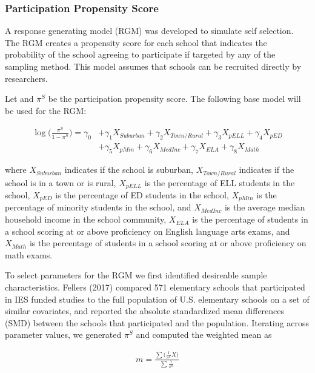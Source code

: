 \documentclass[man,floatsintext]{apa6}
\theoremstyle{definition}
\theoremstyle{definition}
\theoremstyle{definition}
\theoremstyle{remark}
\begin{document}
\hypertarget{participation-propensity-score}{%
\subsubsection{Participation Propensity
Score}\label{participation-propensity-score}}

A response generating model (RGM) was developed to simulate self
selection. The RGM creates a propensity score for each school that
indicates the probability of the school agreeing to participate if
targeted by any of the sampling method. This model assumes that schools
can be recruited directly by researchers.

Let and \(\pi^S\) be the participation propensity score. The following
base model will be used for the RGM:

\begin{align} \label{eq:sRGM}
  \log\bigg(\frac{\pi^S}{1-\pi^S}\bigg) = \gamma_{0} &+ \gamma_{1}X_{Suburban} + \gamma_{2}X_{Town/Rural} + \gamma_{3}X_{pELL} + \gamma_{4}X_{pED} 
  \\
  &+ \gamma_{5}X_{pMin} + \gamma_{6}X_{MedInc} + \gamma_{7}X_{ELA} + \gamma_{8}X_{Math} \nonumber
\end{align}

where \(X_{Suburban}\) indicates if the school is suburban,
\(X_{Town/Rural}\) indicates if the school is in a town or is rural,
\(X_{pELL}\) is the percentage of ELL students in the school,
\(X_{pED}\) is the percentage of ED students in the school, \(X_{pMin}\)
is the percentage of minority students in the school, and \(X_{MedInc}\)
is the average median household income in the school community,
\(X_{ELA}\) is the percentage of students in a school scoring at or
above proficiency on English language arts exams, and \(X_{Math}\) is
the percentage of students in a school scoring at or above proficiency
on math exams.

To select parameters for the RGM we first identified desireable sample
characteristics. Fellers (2017) compared 571 elementary schools that
participated in IES funded studies to the full population of U.S.
elementary schools on a set of similar covariates, and reported the
absolute standardized mean differences (SMD) between the schools that
participated and the population. Iterating across parameter values, we
generated \(\pi^S\) and computed the weighted mean as

\begin{align}
  m = \frac{\sum{(\frac{1}{\pi^S} X})}{\sum{\frac{1}{\pi^S}}}
\end{align}
\end{document}
